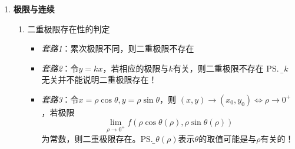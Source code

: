 \begin{enumerate}
  \item {\bf 极限与连续}
  \begin{enumerate}[(1)]
    \item 二重极限存在性的判定
    \begin{itemize}
      \item {\it 套路1}：累次极限不同，则二重极限不存在
      \item {\it 套路2}：令$y=kx$，若相应的极限与$k$有关，则二重极限不存在
      \ps{\b 与$k$无关并不能说明二重极限存在！}
      \item {\it 套路3}：令$x=\rho\cos\theta,y=\rho\sin\theta$，则
      $(x,y)\to(x_0,y_0)\Leftrightarrow\rho\to0^+$，若极限
      $$\lim\limits_{\rho\to0^+}f(\rho\cos\theta(\rho),\rho\sin\theta(\rho))$$
      为常数，则二重极限存在。\ps{\b $\theta(\rho)$表示$\theta$的取值可能是与$\rho$有关的！}
      

\end{itemize}
\end{enumerate}
\end{enumerate}
